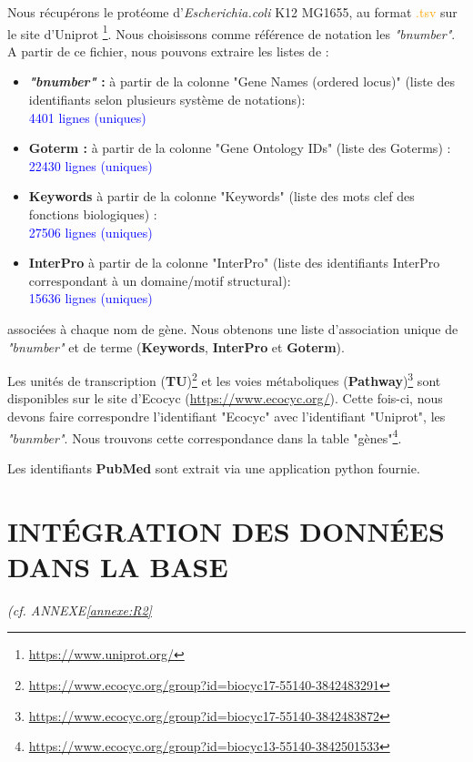 \documentclass[a4paper,11pt,openright]{report}
\begin{document}
Nous récupérons le protéome d'\textit{Escherichia.coli} K12 MG1655, au format \textcolor{orange}{.tsv} sur le site d'Uniprot \footnote{\url{https://www.uniprot.org/}}.  Nous choisissons comme référence de notation les \textit{"bnumber"}. A partir de ce fichier, nous pouvons extraire les listes de :
\begin{itemize}
	\item \textbf{\textit{"bnumber"} : } à partir de la colonne "Gene Names (ordered locus)" (liste des identifiants selon plusieurs système de notations): \\ 
	\textcolor{blue}{4401 lignes (uniques)}
	\item \textbf{Goterm : } à partir de la colonne "Gene Ontology IDs" (liste des Goterms) : \\ 
	\textcolor{blue}{22430  lignes (uniques)}
	\item \textbf{Keywords} à partir de la colonne "Keywords" (liste des mots clef des fonctions biologiques) : \\
	\textcolor{blue}{27506 lignes (uniques)}
	\item \textbf{InterPro} à partir de la colonne "InterPro" (liste des identifiants InterPro correspondant à un domaine/motif structural):\\
	\textcolor{blue}{15636  lignes (uniques)}
\end{itemize}   

associées à chaque nom de gène. Nous obtenons une liste d'association unique de \textit{"bnumber"} et de terme (\textbf{Keywords}, \textbf{InterPro} et \textbf{Goterm}).

Les unités de transcription (\textbf{TU})\footnote{\url{https://www.ecocyc.org/group?id=biocyc17-55140-3842483291}}
 et les voies métaboliques (\textbf{Pathway})\footnote{\url{https://www.ecocyc.org/group?id=biocyc17-55140-3842483872}}
  sont disponibles sur le site d'Ecocyc (\url{https://www.ecocyc.org/}). Cette fois-ci, nous devons faire correspondre l'identifiant "Ecocyc" avec l'identifiant "Uniprot", les \textit{"bunmber"}. Nous trouvons cette correspondance dans la table "gènes"\footnote{\url{https://www.ecocyc.org/group?id=biocyc13-55140-3842501533}}.

Les identifiants \textbf{PubMed} sont extrait via une application python fournie. \\


\section{INTÉGRATION DES DONNÉES DANS LA BASE}
\textit{(cf. ANNEXE\ref{annexe:R2}}
\end{document}

